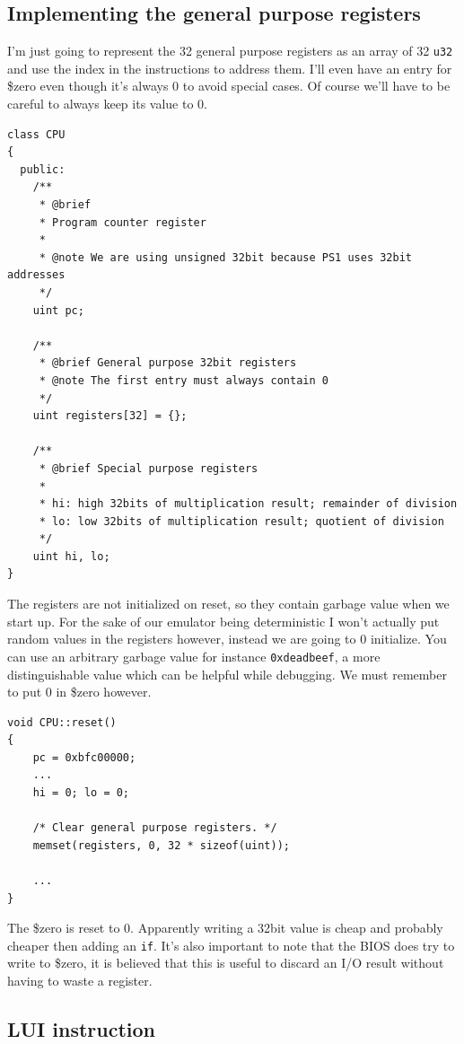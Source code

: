 \documentclass[a4paper]{article}
\newcommand{\code}[1] {\texttt{#1}}
\begin{document}
\subsection{Implementing the general purpose registers}

I'm just going to represent the 32 general purpose registers as an
array of 32 \code{u32} and use the index in the instructions to
address them. I'll even have an entry for \$zero even though it's
always 0 to avoid special cases. Of course we'll have
to be careful to always keep its value to 0.

\begin{lstlisting}
class CPU
{
  public:
	/**
	 * @brief
	 * Program counter register
	 *
	 * @note We are using unsigned 32bit because PS1 uses 32bit addresses
	 */
	uint pc;
         
	/**
	 * @brief General purpose 32bit registers
	 * @note The first entry must always contain 0
	 */
	uint registers[32] = {};

	/**
	 * @brief Special purpose registers
	 *
	 * hi: high 32bits of multiplication result; remainder of division
	 * lo: low 32bits of multiplication result; quotient of division
	 */
	uint hi, lo;
}
\end{lstlisting}

The registers are not initialized on reset, so they contain garbage
value when we start up. For the sake of our emulator being
deterministic I won't actually put random values in the registers
however, instead we are going to 0 initialize.  You can use an arbitrary
garbage value for instance \code{0xdeadbeef}, a more distinguishable
value which can be helpful while debugging. We must remember to put 0
in \$zero however.

\begin{lstlisting}
void CPU::reset()
{
	pc = 0xbfc00000;
	...
	hi = 0; lo = 0;
	
	/* Clear general purpose registers. */
	memset(registers, 0, 32 * sizeof(uint));
	
	...
}
\end{lstlisting}

The \$zero is reset to 0.  Apparently writing a 32bit value is
cheap and probably cheaper then adding an \code{if}. It's also important to
note that the BIOS does try to write to \$zero, it is believed that
this is useful to discard an I/O result without having to waste a
register.

\subsection{LUI instruction}
\end{document}
